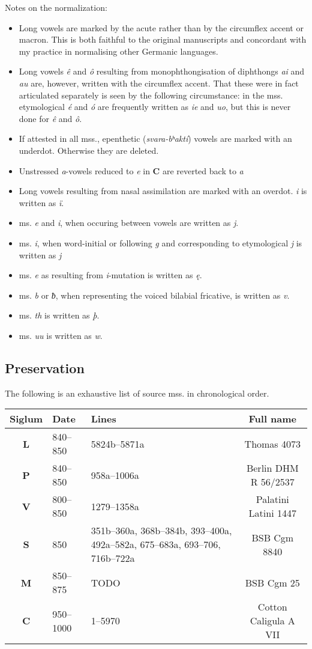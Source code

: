 Notes on the normalization:
  \begin{itemize}
    \item Long vowels are marked by the acute rather than by the circumflex accent or macron. This is both faithful to the original manuscripts and concordant with my practice in normalising other Germanic languages.
    \item Long vowels \emph{ê} and \emph{ô} resulting from monophthongisation of diphthongs \emph{ai} and \emph{au} are, however, written with the circumflex accent. That these were in fact articulated separately is seen by the following circumstance: in the mss. etymological \emph{é} and \emph{ó} are frequently written as \emph{ie} and \emph{uo}, but this is never done for \emph{ê} and \emph{ô}.
    \item If attested in all mss., epenthetic (\emph{svara-bʰaktí}) vowels are marked with an underdot. Otherwise they are deleted.
    \item Unstressed \emph{a}-vowels reduced to \emph{e} in \textbf{C} are reverted back to \emph{a}
    \item Long vowels resulting from nasal assimilation are marked with an overdot. \emph{i} is written as \emph{ï}.
    \item ms. \emph{e} and \emph{i}, when occuring between vowels are written as \emph{j}.
    \item ms. \emph{i}, when word-initial or following \emph{g} and corresponding to etymological \emph{j} is written as \emph{j}
    \item ms. \emph{e} as resulting from \emph{i}-mutation is written as \emph{ę}.
    \item ms. \emph{b} or \emph{ƀ}, when representing the voiced bilabial fricative, is written as \emph{v}.
    \item ms. \emph{th} is written as \emph{þ}.
    \item ms. \emph{uu} is written as \emph{w}.
  \end{itemize}

\subsection{Preservation}
The following is an exhaustive list of source mss. in chronological order.

\begin{longtabu} to \textwidth {|c l l c|}
	\hline
	Siglum & Date & Lines & Full name \\
	\hline\hline\endhead
  \textbf{L} & 840–850 & 5824b–5871a & Thomas 4073 \\
  \textbf{P} & 840–850 & 958a–1006a & Berlin DHM R 56/2537 \\
  \textbf{V} & 800–850 & 1279–1358a & Palatini Latini 1447 \\
  \textbf{S} & 850 & 351b–360a, 368b–384b, 393–400a, 492a–582a, 675–683a, 693–706, 716b–722a & BSB Cgm 8840 \\
  \textbf{M} & 850–875 & TODO & BSB Cgm 25 \\
  \textbf{C} & 950–1000 & 1–5970 & Cotton Caligula A VII \\
	\hline
\end{longtabu}

